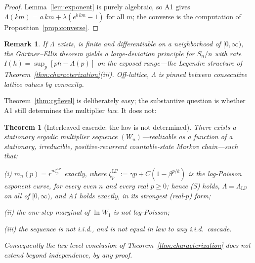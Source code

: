 \documentclass[pdflatex,sn-mathphys-num]{sn-jnl}
\theoremstyle{thmstyleone}
\newtheorem{theorem}{Theorem}
\theoremstyle{thmstyletwo}
\newtheorem*{remark}{Remark}
\theoremstyle{thmstylethree}
\begin{document}
\begin{proof}
Lemma~\ref{lem:exponent} is purely algebraic, so A1 gives
$\Lambda(km) = a\,km + \lambda(e^{b\,km}-1)$ for all $m$; the
converse is the computation of Proposition~\ref{prop:converse}.
\end{proof}

\begin{remark}
If $\Lambda$ exists, is finite and differentiable on a neighborhood
of $[0,\infty)$, the G\"artner--Ellis theorem \cite{DZ98} yields a
large-deviation principle for $S_n/n$ with rate $I(h) =
\sup_p[ph - \Lambda(p)]$ on the exposed range---the Legendre
structure of Theorem~\ref{thm:characterization}(iii).  Off-lattice,
$\Lambda$ is pinned between consecutive lattice values by convexity.
\end{remark}

Theorem~\ref{thm:cgflevel} is deliberately easy; the substantive
question is whether A1 still determines the multiplier \emph{law}.
It does not:

\begin{theorem}[Interleaved cascade: the law is not
determined]\label{thm:interleaved}
There exists a stationary ergodic multiplier sequence
$(W_n)$---realizable as a function of a stationary, irreducible,
positive-recurrent countable-state Markov chain---such that:

\textup{(i)} $m_n(p) = r^{n\zeta^{\mathrm{LP}}_p}$ \emph{exactly},
where $\zeta^{\mathrm{LP}}_p := \gamma p + C(1-\beta^{p/k})$ is the
log-Poisson exponent curve, for
every even $n$ and every real $p \ge 0$; hence \textup{(S)} holds,
$\Lambda = \Lambda_{\mathrm{LP}}$ on all of $[0,\infty)$, and A1
holds exactly, in its strongest (real-$p$) form;

\textup{(ii)} the one-step marginal of $\ln W_1$ is \emph{not}
log-Poisson;

\textup{(iii)} the sequence is not i.i.d., and is not equal in law
to any i.i.d.\ cascade.

Consequently the law-level conclusion of
Theorem~\ref{thm:characterization} does not extend beyond
independence, by any proof.
\end{theorem}
\end{document}

